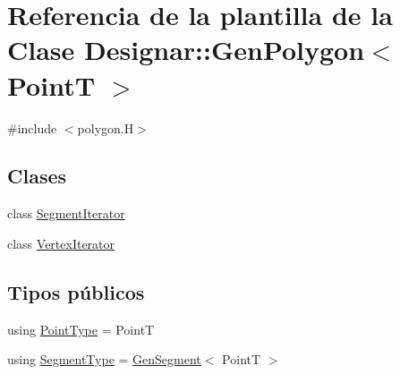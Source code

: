 \hypertarget{class_designar_1_1_gen_polygon}{}\section{Referencia de la plantilla de la Clase Designar\+:\+:Gen\+Polygon$<$ PointT $>$}
\label{class_designar_1_1_gen_polygon}


{\ttfamily \#include $<$polygon.\+H$>$}

\subsection*{Clases}
\begin{DoxyCompactItemize}
\item 
class \hyperlink{class_designar_1_1_gen_polygon_1_1_segment_iterator}{Segment\+Iterator}
\item 
class \hyperlink{class_designar_1_1_gen_polygon_1_1_vertex_iterator}{Vertex\+Iterator}
\end{DoxyCompactItemize}
\subsection*{Tipos públicos}
\begin{DoxyCompactItemize}
\item 
using \hyperlink{class_designar_1_1_gen_polygon_a257735320e85cb672973f88f01625632}{Point\+Type} = PointT
\item 
using \hyperlink{class_designar_1_1_gen_polygon_a06fe54118b31269c3fc76cc9b5e55654}{Segment\+Type} = \hyperlink{class_designar_1_1_gen_segment}{Gen\+Segment}$<$ PointT $>$
\end{DoxyCompactItemize}
